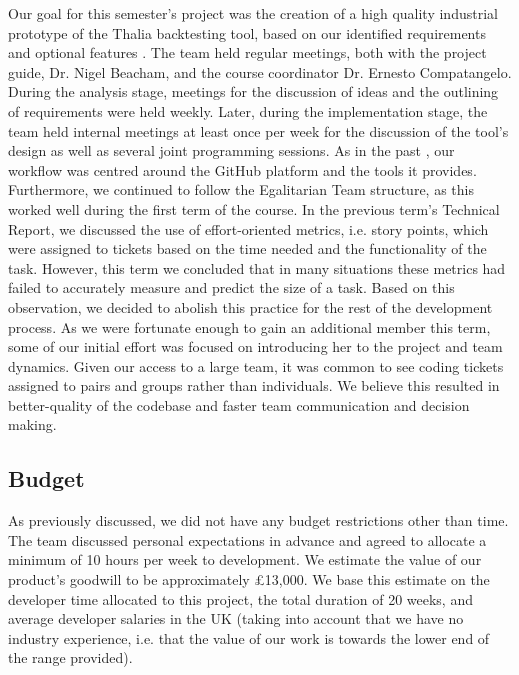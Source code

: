 \documentclass[main.tex]{subfiles}
\begin{document}
Our goal for this semester's project was the creation of a high quality industrial prototype of the Thalia backtesting tool, based on our identified requirements and optional features \cite{TR}. The team held regular meetings, both with the project guide, Dr. Nigel Beacham, and the course coordinator Dr. Ernesto Compatangelo. During the analysis stage, meetings for the discussion of ideas and the outlining of requirements were held weekly. Later, during the implementation stage, the team held internal meetings at least once per week for the discussion of the tool's design as well as several joint programming sessions. \newline \newline
As in the past \cite{TR}, our workflow was centred around the GitHub platform and the tools it provides.
Furthermore, we continued to follow the Egalitarian Team structure, as this worked well during the first term of the course.
In the previous term's Technical Report, we discussed the use of effort-oriented metrics, i.e. story points, which were assigned to tickets based on the time needed and the functionality of the task.
However, this term we concluded that in many situations these metrics had failed to accurately measure and predict the size of a task. Based on this observation, we decided to abolish this practice for the rest of the development process. \newline \newline
As we were fortunate enough to gain an additional member this term, some of our initial effort was focused on introducing her to the project and team dynamics. Given our access to a large team, it was common to see coding tickets assigned to pairs and groups rather than individuals. We believe this resulted in better-quality of the codebase and faster team communication and decision making.

\subsection{Budget}
As previously discussed, we did not have any budget restrictions other than time. The team discussed personal expectations in advance and agreed to allocate a minimum of 10 hours per week to development. We estimate the value of our product's goodwill to be approximately £13,000. We base this estimate on the developer time allocated to this project, the total duration of 20 weeks, and average developer salaries in the UK \cite{DeveloperSalary} (taking into account that we have no industry experience, i.e. that the value of our work is towards the lower end of the range provided).
\end{document}
